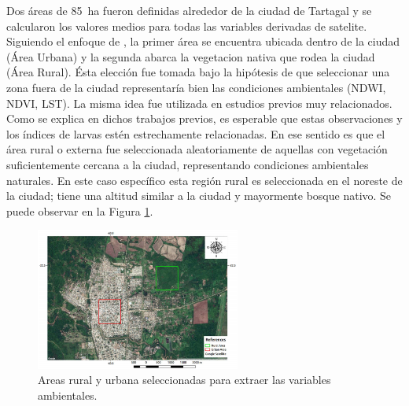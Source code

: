  \par Dos áreas de \SI{85}{\hectare} fueron definidas alrededor de la ciudad de Tartagal
    y se calcularon los valores medios para todas las variables derivadas de
    satelite. Siguiendo el enfoque de
    \cite{models_predicting, dynamics_of_dengue, temporal_modeling},
    la primer área se encuentra ubicada dentro de la ciudad
    (Área Urbana) y la segunda abarca la vegetacion nativa que rodea la ciudad
    (Área Rural). Ésta elección fue tomada bajo la hipótesis de que seleccionar
    una zona fuera de la ciudad representaría bien las condiciones ambientales
    (NDWI, NDVI, LST). La misma idea fue utilizada en estudios previos muy
    relacionados. Como se explica en dichos trabajos previos, es esperable
    que estas observaciones y los índices de larvas
    estén estrechamente relacionadas. En ese sentido es que el área rural o
    externa fue seleccionada aleatoriamente de aquellas con vegetación suficientemente
    cercana a la ciudad, representando condiciones ambientales naturales.
    En este caso específico esta región rural es seleccionada en el
    noreste de la ciudad; tiene una altitud similar a la ciudad y mayormente
    bosque nativo. Se puede observar en la Figura \ref{fig:zones}.
    \begin{figure}[hbt]
    \centering%
    \includegraphics[width=0.6\textwidth]{images/zones}%
    \caption{Areas rural y urbana seleccionadas para extraer las variables ambientales.}\label{fig:zones}
    \end{figure}


